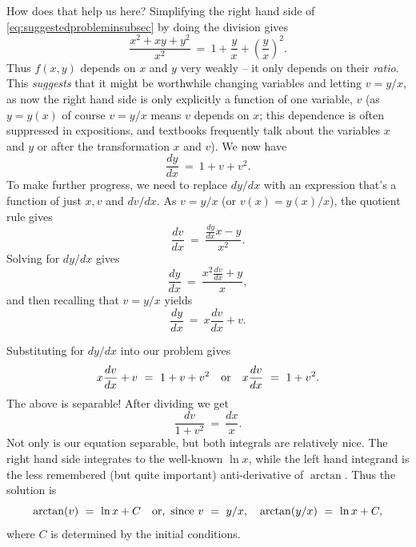 \documentclass[12pt,reqno]{amsart}
\theoremstyle{plain}
\numberwithin{equation}{section} %
\numberwithin{table}{section} %
\numberwithin{figure}{section}
\begin{document}
How does that help us here? Simplifying the right hand side of \eqref{eq:suggestedprobleminsubsec} by doing the division gives $$\frac{x^2 + xy + y^2}{x^2} \ = \ 1 + \frac{y}{x} + \left(\frac{y}{x}\right)^2.$$ Thus $f(x,y)$ depends on $x$ and $y$ very weakly -- it only depends on their \emph{ratio}. This \emph{suggests} that it might be worthwhile changing variables and letting $v = y/x$, as now the right hand side is only explicitly a function of one variable, $v$ (as $y = y(x)$ of course $v = y/x$ means $v$ depends on $x$; this dependence is often suppressed in expositions, and textbooks frequently talk about the variables $x$ and $y$ or after the transformation $x$ and $v$). We now have \begin{equation} \frac{dy}{dx} \ = \ 1 + v + v^2. \end{equation} To make further progress, we need to replace $dy/dx$ with an expression that's a function of just $x, v$ and $dv/dx$. As $v = y/x$ (or $v(x) = y(x)/x$), the quotient rule gives \begin{equation} \frac{dv}{dx} \ = \ \frac{\frac{dy}{dx}x - y}{x^2}. \end{equation} Solving for $dy/dx$ gives \begin{equation} \frac{dy}{dx} \ = \ \frac{x^2 \frac{dv}{dx} + y}{x}, \end{equation} and then recalling that $v = y/x$ yields \begin{equation} \frac{dy}{dx} \ = \ x \frac{dv}{dx} + v. \end{equation}

Substituting for $dy/dx$ into our problem gives \begin{equation} x \frac{dv}{dx} + v \ = \ 1 + v + v^2 \ \ \ {\rm or} \ \ \ x \frac{dv}{dx} \ = \ 1 + v^2. \end{equation} The above is separable! After dividing we get \begin{equation} \frac{dv}{1 + v^2} \ = \ \frac{dx}{x}. \end{equation} Not only is our equation separable, but both integrals are relatively nice. The right hand side integrates to the well-known $\ln x$, while the left hand integrand is the less remembered (but quite important) anti-derivative of $\arctan$. Thus the solution is \begin{equation} \arctan(v) \ = \ \ln x + C \ \ \ {\rm or,\ since\ } v \ = \ y/x, \ \ \ \arctan(y/x) \ = \ \ln x + C, \end{equation} where $C$ is determined by the initial conditions.
\end{document}
